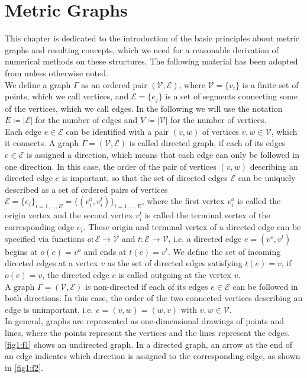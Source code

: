 \section{Metric Graphs}
\label{ch1:sec1}

This chapter is dedicated to the introduction of the basic principles about metric graphs and resulting concepts, which we need for a reasonable derivation of numerical methods on these structures. The following material has been adopted from \cite[chapter~1]{BerkolaikoKuchment:2013} unless otherwise noted. \\

We define a graph $\Gamma$ as an ordered pair $(\mathcal{V}, \mathcal{E})$, where $\mathcal{V} = \{v_i\}$ is a finite set of points, which we call vertices, and $\mathcal{E} = \{e_j\}$ is a set of segments connecting some of the vertices, which we call edges. In the following we will use the notation $E \coloneqq \left\lvert \mathcal{E} \right\rvert$ for the number of edges and $V \coloneqq \left\lvert \mathcal{V} \right\rvert$ for the number of vertices. \\
Each edge $e \in \mathcal{E}$ can be identified with a pair $(v, w)$ of vertices $v, w \in \mathcal{V}$, which it connects. A graph $\Gamma = (\mathcal{V}, \mathcal{E})$ is called directed graph, if each of its edges $e \in \mathcal{E}$ is assigned a direction, which means that each edge can only be followed in one direction. In this case, the order of the pair of vertices $(v, w)$ describing an directed edge $e$ is important, so that the set of directed edges $\mathcal{E}$ can be uniquely described as a set of ordered pairs of vertices $\mathcal{E} = \{e_i\}_{i = 1, \ldots, E} = \{(v^{o}_{i}, v^{t}_{i})\}_{i = 1, \ldots, E}$, where the first vertex $v^{o}_{i}$ is called the origin vertex and the second vertex $v^{t}_{i}$ is called the terminal vertex of the corresponding edge $e_i$. These origin and terminal vertex of a directed edge can be specified via functions $o \colon \mathcal{E} \to \mathcal{V}$ and $t \colon \mathcal{E} \to \mathcal{V}$, i.e. a directed edge $e = (v^{o}, v^{t})$ begins at $o(e) = v^{o}$ and ends at $t(e) = v^{t}$. We define the set of incoming directed edges at a vertex $v$ as the set of directed edges satisfying $t(e) = v$, if $o(e) = v$, the directed edge $e$ is called outgoing at the vertex $v$. \\
A graph $\Gamma = (\mathcal{V}, \mathcal{E})$ is non-directed if each of its edges $e \in \mathcal{E}$ can be followed in both directions. In this case, the order of the two connected vertices describing an edge is unimportant, i.e. $e = (v, w) = (w, v)$ with $v, w \in \mathcal{V}$. \\
In general, graphs are represented as one-dimensional drawings of points and lines, where the points represent the vertices and the lines represent the edges. \cref{fig1:f1} shows an undirected graph. In a directed graph, an arrow at the end of an edge indicates which direction is assigned to the corresponding edge, as shown in \cref{fig1:f2}. 

